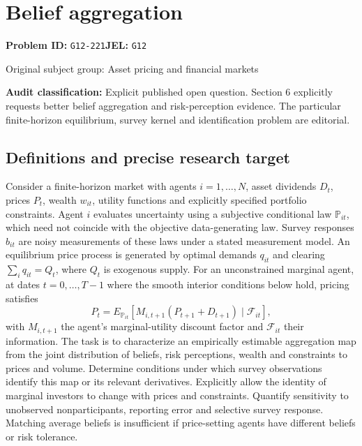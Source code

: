 \documentclass[11pt,a4paper]{article}
\begin{document}
\section*{Belief aggregation}
\textbf{Problem ID:} \texttt{G12-221}\quad \textbf{JEL:} \texttt{G12}\par
\label{problem:OP-0313}
{\sffamily\small\color{muted}Original subject group: Asset pricing and financial markets\par}
\label{definitions:problem:30007595}
\textbf{Audit classification:} Explicit published open question. Section 6 explicitly requests better belief aggregation and risk-perception evidence. The particular finite-horizon equilibrium, survey kernel and identification problem are editorial.
\subsection*{Definitions and precise research target}
Consider a finite-horizon market with agents \(i=1,\ldots,N\), asset dividends \(D_t\), prices \(P_t\), wealth \(w_{it}\), utility functions and explicitly specified portfolio constraints. Agent \(i\) evaluates uncertainty using a subjective conditional law \(\mathbb P_{it}\), which need not coincide with the objective data-generating law. Survey responses \(b_{it}\) are noisy measurements of these laws under a stated measurement model. An equilibrium price process is generated by optimal demands \(q_{it}\) and clearing \(\sum_iq_{it}=Q_t\), where \(Q_t\) is exogenous supply. For an unconstrained marginal agent, at dates \(t=0,\ldots,T-1\) where the smooth interior conditions below hold, pricing satisfies
\[P_t=E_{\mathbb P_{it}}[M_{i,t+1}(P_{t+1}+D_{t+1})\mid\mathcal F_{it}],\]
with \(M_{i,t+1}\) the agent's marginal-utility discount factor and \(\mathcal F_{it}\) their information. The task is to characterize an empirically estimable aggregation map from the joint distribution of beliefs, risk perceptions, wealth and constraints to prices and volume. Determine conditions under which survey observations identify this map or its relevant derivatives. Explicitly allow the identity of marginal investors to change with prices and constraints. Quantify sensitivity to unobserved nonparticipants, reporting error and selective survey response. Matching average beliefs is insufficient if price-setting agents have different beliefs or risk tolerance.
\end{document}

